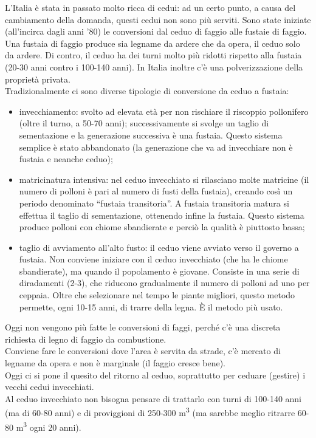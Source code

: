 L'Italia è stata in passato molto ricca di cedui: ad un certo punto, a causa del cambiamento della domanda, questi cedui non sono più serviti. Sono state iniziate (all'incirca dagli anni '80) le conversioni dal ceduo di faggio alle fustaie di faggio. Una fustaia di faggio produce sia legname da ardere che da opera, il ceduo solo da ardere. Di contro, il ceduo ha dei turni molto più ridotti rispetto alla fustaia (20-30 anni contro i 100-140 anni). In Italia inoltre c'è una polverizzazione della proprietà privata.\\
Tradizionalmente ci sono diverse tipologie di conversione da ceduo a fustaia:
\begin{itemize}[nosep]
    \item invecchiamento: svolto ad elevata età per non rischiare il riscoppio pollonifero (oltre il turno, a 50-70 anni); successivamente si svolge un taglio di sementazione e la generazione successiva è una fustaia. Questo sistema semplice è stato abbandonato (la generazione che va ad invecchiare non è fustaia e neanche ceduo); 
    \item matricinatura intensiva: nel ceduo invecchiato si rilasciano molte matricine (il numero di polloni è pari al numero di fusti della fustaia), creando così un periodo denominato ``fustaia transitoria''. A fustaia transitoria matura si effettua il taglio di sementazione, ottenendo infine la fustaia. Questo sistema produce polloni con chiome sbandierate e perciò la qualità è piuttosto bassa;
    \item taglio di avviamento all'alto fusto: il ceduo viene avviato verso il governo a fustaia. Non conviene iniziare con il ceduo invecchiato (che ha le chiome sbandierate), ma quando il popolamento è giovane. Consiste in una serie di diradamenti (2-3), che riducono gradualmente il numero di polloni ad uno per ceppaia. Oltre che selezionare nel tempo le piante migliori, questo metodo permette, ogni 10-15 anni, di trarre della legna. È il metodo più usato.
\end{itemize}
Oggi non vengono più fatte le conversioni di faggi, perché c'è una discreta richiesta di legno di faggio da combustione.\\
Conviene fare le conversioni dove l'area è servita da strade, c'è mercato di legname da opera e non è marginale (il faggio cresce bene).\\
Oggi ci si pone il quesito del ritorno al ceduo, soprattutto per ceduare (gestire) i vecchi cedui invecchiati.\\
Al ceduo invecchiato non bisogna pensare di trattarlo con turni di 100-140 anni (ma di 60-80 anni) e di proviggioni di 250-300 \unit{m^3} (ma sarebbe meglio ritrarre 60-80 \unit{m^3} ogni 20 anni).
